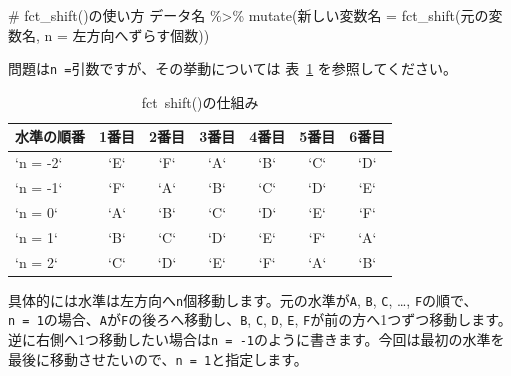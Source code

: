 \documentclass[
  a4paper,
  pandoc,
  ja=standard,
  jafont=haranoaji]{bxjsbook}
\newenvironment{Shaded}{\begin{snugshade}}{\end{snugshade}}
\newcommand{\AttributeTok}[1]{\textcolor[rgb]{0.00,0.48,0.65}{#1}}
\newcommand{\CommentTok}[1]{\textcolor[rgb]{0.37,0.37,0.37}{#1}}
\newcommand{\DecValTok}[1]{\textcolor[rgb]{0.68,0.00,0.00}{#1}}
\newcommand{\FunctionTok}[1]{\textcolor[rgb]{0.28,0.35,0.67}{#1}}
\newcommand{\NormalTok}[1]{\textcolor[rgb]{0.00,0.48,0.65}{#1}}
\newcommand{\OtherTok}[1]{\textcolor[rgb]{0.00,0.48,0.65}{#1}}
\newcommand{\SpecialCharTok}[1]{\textcolor[rgb]{0.37,0.37,0.37}{#1}}
\begin{document}
\begin{Shaded}
\begin{Highlighting}[numbers=left,,]
\CommentTok{\# fct\_shift()の使い方}
\NormalTok{データ名 }\SpecialCharTok{\%\textgreater{}\%}
  \FunctionTok{mutate}\NormalTok{(新しい変数名 }\OtherTok{=} \FunctionTok{fct\_shift}\NormalTok{(元の変数名, }\AttributeTok{n =}\NormalTok{ 左方向へずらす個数))}
\end{Highlighting}
\end{Shaded}

問題は\texttt{n\ =}引数ですが、その挙動については 表~\ref{tbl-factor1}
を参照してください。

\hypertarget{tbl-factor1}{}
\begin{table}
\caption{\label{tbl-factor1}fct shift()の仕組み }

\centering
\begin{tabular}{l|c|c|c|c|c|c}
\hline
水準の順番 & 1番目 & 2番目 & 3番目 & 4番目 & 5番目 & 6番目\\
\hline
`n = -2` & `E` & `F` & `A` & `B` & `C` & `D`\\
\hline
`n = -1` & `F` & `A` & `B` & `C` & `D` & `E`\\
\hline
`n = 0` & `A` & `B` & `C` & `D` & `E` & `F`\\
\hline
`n = 1` & `B` & `C` & `D` & `E` & `F` & `A`\\
\hline
`n = 2` & `C` & `D` & `E` & `F` & `A` & `B`\\
\hline
\end{tabular}
\end{table}

具体的には水準は左方向へ\texttt{n}個移動します。元の水準が\texttt{A},
\texttt{B}, \texttt{C}, \ldots,
\texttt{F}の順で、\texttt{n\ =\ 1}の場合、\texttt{A}が\texttt{F}の後ろへ移動し、\texttt{B},
\texttt{C}, \texttt{D}, \texttt{E},
\texttt{F}が前の方へ1つずつ移動します。逆に右側へ1つ移動したい場合は\texttt{n\ =\ -1}のように書きます。今回は最初の水準を最後に移動させたいので、\texttt{n\ =\ 1}と指定します。

\begin{Shaded}
\end{Shaded}
\end{document}
